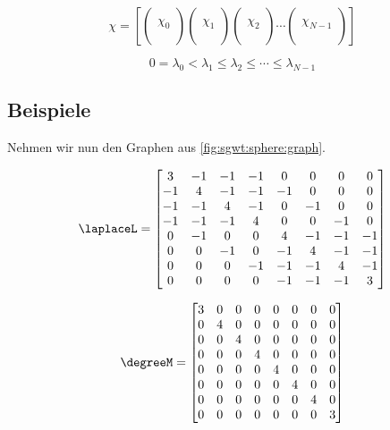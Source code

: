 \begin{equation}
\chi = 
\left[
\begin{pmatrix}\\\chi_0\\\\\end{pmatrix}
\begin{pmatrix}\\\chi_1\\\\\end{pmatrix}
\begin{pmatrix}\\\chi_2\\\\\end{pmatrix}
\cdots
\begin{pmatrix}\\\chi_{N-1}\\\\\end{pmatrix}
\right]
\end{equation}

\begin{equation}
0 = \lambda_0 < \lambda_1 \le \lambda_2 \le \cdots \le \lambda_{N-1}
\end{equation}

\subsection{Beispiele}

Nehmen wir nun den Graphen aus \cref{fig:sgwt:sphere:graph}.

\begin{equation}
\laplaceL =
\begin{bmatrix}
3 & -1 & -1 & -1 & 0 & 0 & 0 & 0 \\
-1 &  4 & -1 & -1 & -1 & 0 & 0 & 0 \\
-1 & -1 &  4 & -1 & 0 & -1 & 0 & 0 \\
-1 & -1 & -1 &  4 & 0 & 0 & -1 & 0 \\
0 & -1 & 0 & 0 &  4 & -1 & -1 & -1 \\
0 & 0 & -1 & 0 & -1 &  4 & -1 & -1 \\
0 & 0 & 0 & -1 & -1 & -1 &  4 & -1 \\
0 & 0 & 0 & 0 & -1 & -1 & -1 &  3
\end{bmatrix}
\end{equation}

\begin{equation}
\degreeM =
\begin{bmatrix}
3 & 0 & 0 & 0 & 0 & 0 & 0 & 0 \\
0 & 4 & 0 & 0 & 0 & 0 & 0 & 0 \\
0 & 0 & 4 & 0 & 0 & 0 & 0 & 0 \\
0 & 0 & 0 & 4 & 0 & 0 & 0 & 0 \\
0 & 0 & 0 & 0 & 4 & 0 & 0 & 0 \\
0 & 0 & 0 & 0 & 0 & 4 & 0 & 0 \\
0 & 0 & 0 & 0 & 0 & 0 & 4 & 0 \\
0 & 0 & 0 & 0 & 0 & 0 & 0 & 3
\end{bmatrix}
\end{equation}

